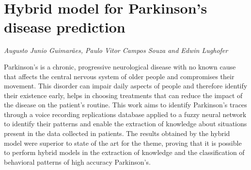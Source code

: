 \documentclass[../booklet.tex]{subfiles}
\begin{document}
\section[Hybrid model for Parkinson's disease prediction. {\it Augusto Junio Guimarães, Paulo Vitor Campos Souza and Edwin Lughofer}]{Hybrid model for Parkinson's disease prediction}
  

\begin{center}
  {\it Augusto Junio Guimarães, Paulo Vitor Campos Souza and Edwin Lughofer}
\end{center}

\vskip 0.8cm


Parkinson's is a chronic, progressive neurological disease with no known cause that affects the central nervous system of older people and compromises their movement. This disorder can impair daily aspects of people and therefore identify their existence early, helps in choosing treatments that can reduce the impact of the disease on the patient's routine. This work aims to identify Parkinson's traces through a voice recording replications database applied to a fuzzy neural network to identify their patterns and enable the extraction of knowledge about situations present in the data collected in patients. The results obtained by the hybrid model were superior to state of the art for the theme, proving that it is possible to perform hybrid models in the extraction of knowledge and the classification of behavioral patterns of high accuracy Parkinson's.

\end{document}
